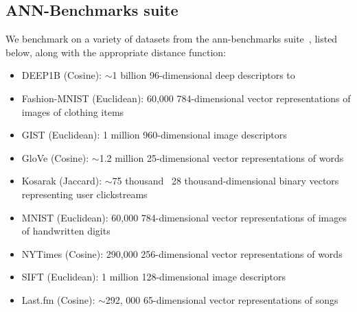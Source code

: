 \subsection{ANN-Benchmarks suite}
\label{subsec:datasets:ann-benchmarks-suite}

We benchmark on a variety of datasets from the ann-benchmarks suite~\cite{Aumller2018ANNBenchmarksAB}, 
listed below, along with the appropriate distance function: 

\begin{itemize} 
    \item DEEP1B (Cosine): $\sim$1 billion 96-dimensional deep descriptors to 
    \item Fashion-MNIST (Euclidean): 60,000 784-dimensional vector representations of images of clothing items
    \item GIST (Euclidean): 1 million 960-dimensional image descriptors 
    \item GloVe (Cosine): $\sim$1.2 million 25-dimensional vector representations of words
    \item Kosarak (Jaccard): $\sim$75 thousand ~28 thousand-dimensional binary vectors representing user clickstreams
    \item MNIST (Euclidean): 60,000 784-dimensional vector representations of images of handwritten digits
    \item NYTimes (Cosine): 290,000 256-dimensional vector representations of words
    \item SIFT (Euclidean): 1 million 128-dimensional image descriptors
    \item Last.fm (Cosine): $\sim$292, 000 65-dimensional vector representations of songs
\end{itemize}